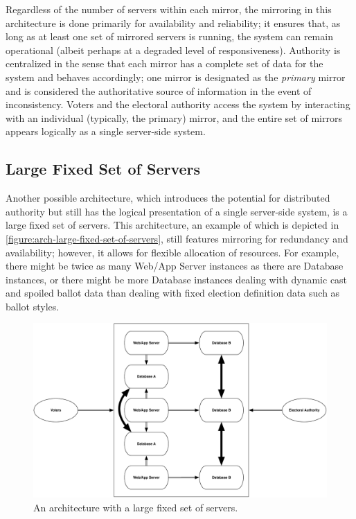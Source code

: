 Regardless of the number of servers within each mirror, the mirroring
in this architecture is done primarily for availability and
reliability; it ensures that, as long as at least one set of mirrored
servers is running, the system can remain operational (albeit perhaps
at a degraded level of responsiveness). Authority is centralized in
the sense that each mirror has a complete set of data for the system
and behaves accordingly; one mirror is designated as the
\emph{primary} mirror and is considered the authoritative source of
information in the event of inconsistency. Voters and the electoral
authority access the system by interacting with an individual
(typically, the primary) mirror, and the entire set of mirrors appears
logically as a single server-side system.

\subsection{Large Fixed Set of Servers}

Another possible architecture, which introduces the potential for
distributed authority but still has the logical presentation of a
single server-side system, is a large fixed set of servers. This
architecture, an example of which is depicted in
\autoref{figure:arch-large-fixed-set-of-servers}, still features
mirroring for redundancy and availability; however, it allows for
flexible allocation of resources. For example, there might be twice as
many Web/App Server instances as there are Database instances, or
there might be more Database instances dealing with dynamic cast and
spoiled ballot data than dealing with fixed election definition data
such as ballot styles.

\begin{figure}[p]
\begin{center}
\includegraphics[width=6.5in]{architecture_resources/large-fixed-set-of-servers.pdf}
\end{center}
\caption{An architecture with a large fixed set of servers.}
\label{figure:arch-large-fixed-set-of-servers}
\end{figure}

